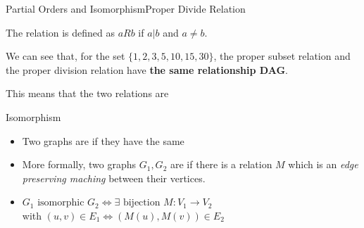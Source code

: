 \begin{frame}{Partial Orders and Isomorphism}{Proper Divide Relation}

  The  relation is defined as $a R b$ if $a|b$ and $a \neq b$.\bigskip

  We can see that, for the set $\{1,2,3,5,10,15,30\}$, the proper subset relation and the proper division relation have {\bf the same relationship DAG}.\bigskip

  This means that the two relations are 

  \begin{center}
  \end{center}
\end{frame}

\begin{frame}{Isomorphism}

    \begin{itemize}
    \item Two graphs are  if they have the same \bigskip

    \item More formally, two graphs $G_1, G_2$ are  if there is a relation $M$ which is an \emph{edge preserving maching} between their vertices.\bigskip

    \item $G_1 \text{ isomorphic } G_2 \iff \exists \text { bijection
    } M:V_1\to V_2$\\\hfill with $(u,v) \in E_1 \iff
      (M(u),M(v)) \in E_2$

    \end{itemize}
\end{frame}


